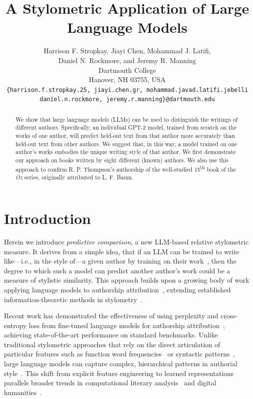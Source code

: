 \documentclass[11pt]{article}
\title{A Stylometric Application of Large Language Models}
\author{Harrison F. Stropkay, Jiayi Chen, Mohammad J. Latifi,\\
Daniel N. Rockmore, and Jeremy R. Manning\\
Dartmouth College \\
Hanover, NH 03755, USA \\
\texttt{\{harrison.f.stropkay.25, jiayi.chen.gr, mohammad.javad.latifi.jebelli}\\\texttt{daniel.n.rockmore, jeremy.r.manning\}@dartmouth.edu}}
\date{}
\begin{document}
\maketitle

\begin{abstract}

We show that large language models (LLMs) can be used to distinguish the
writings of different authors. Specifically, an individual GPT-2 model, trained
from scratch on the works of one author, will predict held-out text from that
author more accurately than held-out text from other authors. We suggest that,
in this way, a model trained on one author's works embodies the unique writing
style of that author. We first demonstrate our approach on books written by
eight different (known) authors. We also use this approach to confirm R. P.
Thompson's authorship of the well-studied 15\textsuperscript{th} book of the
\textit{Oz} series, originally attributed to L. F. Baum.

\end{abstract}

\section{Introduction}

Herein we introduce {\em predictive comparison}, a new LLM-based relative
stylometric measure. It derives from a simple idea, that if an LLM can be
trained to write like---i.e., in the style of---a given author by training on
their work~\citep[e.g., ][]{Mikr25}, then the degree to which such a model can
predict another author's work could be a measure of stylistic similarity. This
approach builds upon a growing body of work applying language models to
authorship attribution~\citep{HuanEtal25,UcheEtal20}, extending established
information-theoretic methods in stylometry~\citep{JuolBaay05,ZhaoEtal06}.

Recent work has demonstrated the effectiveness of using perplexity and
cross-entropy loss from fine-tuned language models for authorship
attribution~\citep{HuanEtal25}, achieving state-of-the-art performance on
standard benchmarks. Unlike traditional stylometric approaches that rely on the
direct articulation of particular features such as function word
frequencies~\citep{MostWall63} or syntactic patterns~\citep{Holm98}, large
language models can capture complex, hierarchical patterns in authorial
style~\citep{FabiEtal20}. This shift from explicit feature engineering to
learned representations parallels broader trends in computational literary
analysis~\citep{More00,UndeEtal19} and digital humanities~\citep{HughEtal12}.
\end{document}

